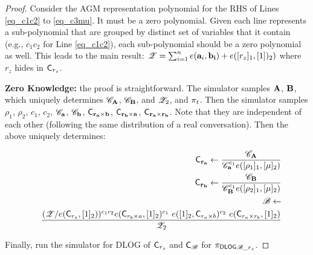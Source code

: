 \begin{proof}
% 
Consider the AGM representation polynomial for the
RHS of Lines \ref{eq_c1c2} to \ref{eq_c3mu}.
It must be a zero polynomial.  Given each line represents
a sub-polynomial that are grouped by distinct set of
variables that it contain (e.g., $c_1 c_2$ for 
Line \ref{eq_c1c2}), each sub-polynomial should be
a zero polynomial as well. This leads to
the main result:
${\mathscr{Z}} = \sum_{i=1}^n e({{\mathbf {a}}}_i, {{\mathbf {b_i}}}) + e([r_z]_1, [1])_2)$
where $r_z$ hides in ${\mathsf{C}}_{r_z}$.

{\bf Zero Knowledge:} the proof is straightforward. The simulator
samples ${{\mathbf {A}}}$, ${{\mathbf {B}}}$, which uniquely determines
${\mathscr{C}}_{{\mathbf {A}}}$, ${\mathscr{C}}_{{\mathbf {B}}}$, and ${\mathscr{Z}}_2$, and
$\pi_t$.
Then the simulator samples $\rho_1$, $\rho_2$, 
$c_1$, $c_2$, ${\mathscr{C}}_{{\mathbf {a}}}$,
${\mathscr{C}}_{{\mathbf {b}}}$, 
${\mathsf{C}}_{{{\mathbf {r_a}}} \times {{\mathbf {b}}}}$,
${\mathsf{C}}_{{{\mathbf {r_b}}} \times {{\mathbf {a}}}}$,
${\mathsf{C}}_{{{\mathbf {r_a}}} \times {{\mathbf {r_b}}}}$. Note that they
are independent of each other (following the same distribution of
a real conversation).
Then the above uniquely determines: 

\begin{footnotesize}
\begin{eqnarray*}
& & {\mathsf{C}}_{{{\mathbf {r_a}}}} \leftarrow 
\frac{{\mathscr{C}}_{{{\mathbf {A}}}} }
{ {\mathscr{C}}_{{{\mathbf {a}}}}^{c_1} e([\rho_1]_1, [\mu]_2) } \\
& & {\mathsf{C}}_{{{\mathbf {r_b}}}} \leftarrow 
\frac{{\mathscr{C}}_{{{\mathbf {B}}}} }
{ {\mathscr{C}}_{{{\mathbf {B}}}}^{c_1} e([\rho_2]_1, [\mu]_2) } \\
& &{\mathscr{B}} \leftarrow  \\
& &\frac{
			({\mathscr{Z}} / e({\mathsf{C}}_{r_z}, [1]_2))^{c_1 c_2}
			e({\mathsf{C}}_{r_b \times a}, [1]_2)^{c_1}~
			e([1]_2, {\mathsf{C}}_{r_a \times b})^{c_2}~
			e({\mathsf{C}}_{r_a \times r_b}, [1]_2)}
			{ {\mathscr{Z}}_2 }
\end{eqnarray*}
\end{footnotesize}

Finally, run the simulator for DLOG of
${\mathsf{C}}_{r_z}$ and ${\mathsf{C}}_{{\mathscr{B}}}$ for 
${\pi_{\textsf{DLOG}}}_{{\mathscr{B}}\_r_z}$.
\end{proof}

